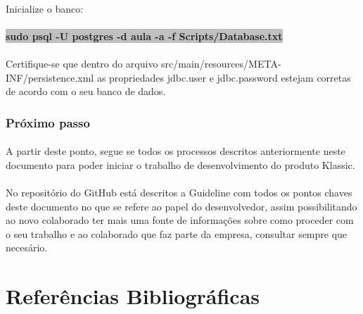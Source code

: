 \documentclass[	DIV=calc,%
							paper=a4,%
							fontsize=12pt,%
							onecolumn]{scrartcl}	 					%
\begin{document}
\paragraph{}
Inicialize o banco:
\paragraph{}
\textbf{\colorbox{Silver}{sudo psql -U postgres -d aula -a -f Scripts/Database.txt}}
\paragraph{}
Certifique-se que dentro do arquivo src/main/resources/META-INF/persistence.xml as
propriedades jdbc.user e jdbc.password estejam corretas de acordo com o seu banco de
dados.
\subsubsection{Próximo passo}
\paragraph{}
A partir deste ponto, segue se todos os processos descritos anteriormente neste documento para poder iniciar o trabalho de desenvolvimento do produto Klassic.
\paragraph{}
No repositório do GitHub está descritos a Guideline com todos os pontos chaves deste documento no que se refere ao papel do desenvolvedor, assim possibilitando ao novo colaborado ter mais uma fonte de informações sobre como proceder com o seu trabalho e ao colaborado que faz parte da empresa, consultar sempre que necesário.



\newpage
\section{Referências Bibliográficas}
\renewcommand\refname{} %

 
\end{document}
